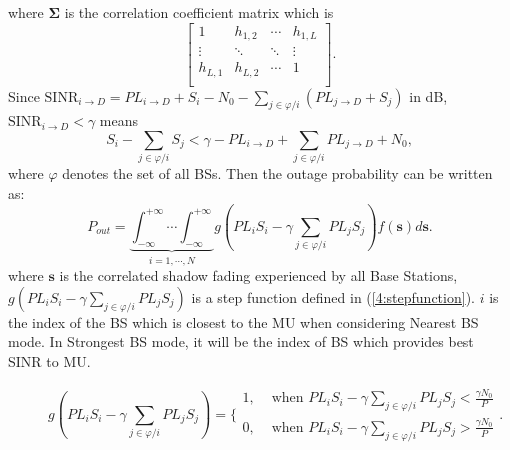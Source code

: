  where $\mathbf{\Sigma}$ is the correlation coefficient matrix which is
 \begin{equation}
 \left[\begin{array}{cccc}
 1 & h_{1,2} & \cdots & h_{1,L}\\
 \vdots & \ddots & \ddots & \vdots\\
 h_{L,1} & h_{L,2} & \cdots & 1\\
 \end{array}\right].
 \end{equation}
 Since $\text{SINR}_{i\to D}=PL_{i\to D}+S_{i}-N_{0}-\sum_{j\in\varphi/i}(PL_{j\to D} + S_{j})$ in dB, $\text{SINR}_{i\to D}<\gamma$ means
 \begin{equation}
 S_{i} - \sum_{j\in\varphi/i}S_{j}<\gamma -PL_{i\to D} + \sum_{j\in\varphi/i}PL_{j\to D} + N_{0},
 \end{equation}
 where $\varphi$ denotes the set of all BSs.
 Then the outage probability can be written as:
 \begin{equation}
 \label{4:outprob}
 P_{out} = \underbrace{\int_{-\infty}^{+\infty}\cdots\int_{-\infty}^{+\infty}}_{i =1,\cdots,N} g(PL_{i}S_{i} - \gamma\sum_{j\in\varphi/i}PL_{j}S_{j})f(\mathbf{s})d\mathbf{s}.
 \end{equation}
 where $\mathbf{s}$ is the correlated shadow fading experienced by all Base Stations, $g(PL_{i}S_{i} - \gamma\sum_{j\in\varphi/i}PL_{j}S_{j})$ is a step function defined in (\ref{4:stepfunction}). $i$ is the index of the BS which is closest to the MU when considering Nearest BS mode. In Strongest BS mode, it will be the index of BS which provides best SINR to MU.
 \begin{figure}[!t]
 \normalsize

 \begin{equation}
 \label{4:stepfunction}
 g(PL_{i}S_{i} - \gamma\sum_{j\in\varphi/i}PL_{j}S_{j}) = \{\begin{array}{cc}
                1, &  \text{  when }PL_{i}S_{i} - \gamma\sum_{j\in\varphi/i}PL_{j}S_{j} <\frac{\gamma N_{0}}{P}\\
                0, & \text{  when }PL_{i}S_{i} - \gamma\sum_{j\in\varphi/i}PL_{j}S_{j} >\frac{\gamma N_{0}}{P}
              \end{array}.
 \end{equation}
 \hrulefill
 \vspace*{4pt}
 \end{figure}

